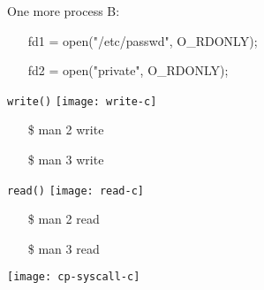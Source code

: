 \begin{frame}
  \begin{block}{One more process B:}\ttfamily
    \begin{itemize}
    \item[] fd1 = open("/etc/passwd", O\_RDONLY);
    \item[] fd2 = open("private", O\_RDONLY);
    \end{itemize}
  \end{block}
  \begin{center}
  \end{center}
\end{frame}

\begin{frame}
  \begin{minipage}[t]{.53\linewidth}
    \begin{block}{\texttt{write()}}
      \texttt{[image: write-c]}
    \end{block}
    \ttfamily
    \begin{itemize}
    \item[\$] man 2 write
    \item[\$] man 3 write
    \end{itemize}
  \end{minipage}\qquad
  \begin{minipage}[t]{.37\linewidth}
    \begin{block}{\texttt{read()}}
      \texttt{[image: read-c]}
    \end{block}
    \ttfamily
    \begin{itemize}
    \item[\$] man 2 read
    \item[\$] man 3 read
    \end{itemize}
  \end{minipage}
\end{frame}

\begin{frame}{}
  \begin{center}
    \texttt{[image: cp-syscall-c]}
  \end{center}
\end{frame}

